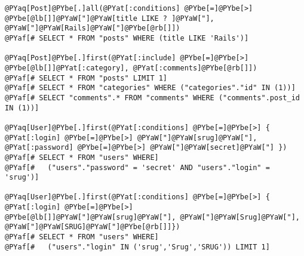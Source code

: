 \begin{Verbatim}[commandchars=@\[\]]
@PYaq[Post]@PYbe[.]all(@PYat[:conditions] @PYbe[=]@PYbe[>] @PYbe[@lb[]]@PYaW["]@PYaW[title LIKE ? ]@PYaW["], @PYaW["]@PYaW[Rails]@PYaW["]@PYbe[@rb[]])
@PYaf[# SELECT * FROM "posts" WHERE (title LIKE 'Rails')]

@PYaq[Post]@PYbe[.]first(@PYat[:include] @PYbe[=]@PYbe[>] @PYbe[@lb[]]@PYat[:category], @PYat[:comments]@PYbe[@rb[]])
@PYaf[# SELECT * FROM "posts" LIMIT 1]
@PYaf[# SELECT * FROM "categories" WHERE ("categories"."id" IN (1))]
@PYaf[# SELECT "comments".* FROM "comments" WHERE ("comments".post_id IN (1))]

@PYaq[User]@PYbe[.]first(@PYat[:conditions] @PYbe[=]@PYbe[>] { @PYat[:login] @PYbe[=]@PYbe[>] @PYaW["]@PYaW[srug]@PYaW["], @PYat[:password] @PYbe[=]@PYbe[>] @PYaW["]@PYaW[secret]@PYaW["] })
@PYaf[# SELECT * FROM "users" WHERE]
@PYaf[#   ("users"."password" = 'secret' AND "users"."login" = 'srug')]

@PYaq[User]@PYbe[.]first(@PYat[:conditions] @PYbe[=]@PYbe[>] { @PYat[:login] @PYbe[=]@PYbe[>] @PYbe[@lb[]]@PYaW["]@PYaW[srug]@PYaW["], @PYaW["]@PYaW[Srug]@PYaW["], @PYaW["]@PYaW[SRUG]@PYaW["]@PYbe[@rb[]]})
@PYaf[# SELECT * FROM "users" WHERE]
@PYaf[#   ("users"."login" IN ('srug','Srug','SRUG')) LIMIT 1]
\end{Verbatim}
